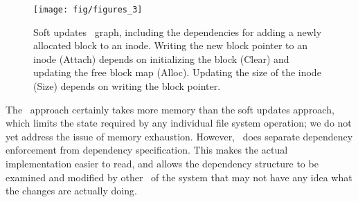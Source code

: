 \begin{figure}[htb]
  \centering
  \texttt{[image: fig/figures\_3]}
  \caption{\label{fig:softupdate} Soft updates \chdesc\ graph,
  including the dependencies for adding a newly allocated block to an
  inode. Writing the new block pointer to an inode (Attach) depends on
  initializing the block (Clear) and updating the free block map (Alloc).
  Updating the size of the inode (Size) depends on writing the block
  pointer.}
\end{figure}


The \Kudos\ approach certainly takes more memory than the soft updates
approach, which limits the state required by any individual file system
operation; we do not yet address the issue of memory exhaustion.
%
However, \Kudos\ does separate dependency enforcement
from dependency specification. This makes the actual
implementation easier to read, and allows the dependency structure to be
examined and modified by other \modules\ of the system that may not have any
idea what the changes are actually doing.
